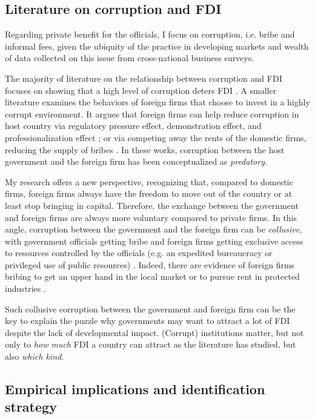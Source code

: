 \subsection{Literature on corruption and FDI}

Regarding private benefit for the officials, I focus on corruption, i.e. bribe and informal fees, given the ubiquity of the practice in developing markets and wealth of data collected on this issue from cross-national business surveys. 

The majority of literature on the relationship between corruption and FDI focuses on showing that a high level of corruption deters FDI \citep{Wei2000, Hakkala2008, Al-Sadig2009}. A smaller literature examines the behaviors of foreign firms that choose to invest in a highly corrupt environment. It argues that foreign firms can help reduce corruption in host country via regulatory pressure effect, demonstration effect, and professionalization effect \citep{Kwok2006}; or via competing away the rents of the domestic firms, reducing the supply of bribes \citep{Sandholtz2003}. In these works, corruption between the host government and the foreign firm has been conceptualized as \textit{predatory}.

My research offers a new perspective, recognizing that, compared to domestic firms, foreign firms always have the freedom to move out of the country or at least stop bringing in capital. Therefore, the exchange between the government and foreign firms are always more voluntary compared to private firms. In this angle, corruption between the government and the foreign firm can be \textit{collusive}, with government officials getting bribe and foreign firms getting exclusive access to resources controlled by the officials (e.g. an expedited bureaucracy or privileged use of public resources) \citep{Hellman2002}. Indeed, there are evidence of foreign firms bribing to get an upper hand in the local market \citep{Barstow2012} or to pursue rent in protected industries \citep{Malesky2015}. 

Such collusive corruption between the government and foreign firm can be the key to explain the puzzle why governments may want to attract a lot of FDI despite the lack of developmental impact. (Corrupt) institutions matter, but not only to \textit{how much} FDI a country can attract as the literature has studied, but also \textit{which kind}.


\subsection{Empirical implications and identification strategy}

